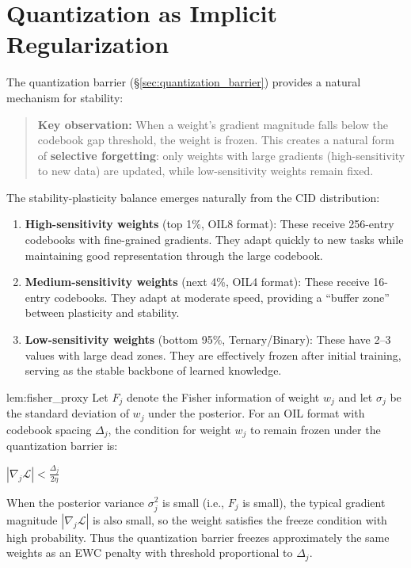 \section{Quantization as Implicit Regularization}
\label{sec:quant_as_regularization}

The quantization barrier (\S\ref{sec:quantization_barrier}) provides a natural mechanism for stability:

\begin{quote}
\textbf{Key observation:} When a weight's gradient magnitude falls below the codebook gap threshold, the weight is frozen. This creates a natural form of \textbf{selective forgetting}: only weights with large gradients (high-sensitivity to new data) are updated, while low-sensitivity weights remain fixed.
\end{quote}

The stability-plasticity balance emerges naturally from the CID distribution:

\begin{enumerate}
    \item \textbf{High-sensitivity weights} (top 1\%, OIL8 format): These receive 256-entry codebooks with fine-grained gradients. They adapt quickly to new tasks while maintaining good representation through the large codebook.
    \item \textbf{Medium-sensitivity weights} (next 4\%, OIL4 format): These receive 16-entry codebooks. They adapt at moderate speed, providing a ``buffer zone'' between plasticity and stability.
    \item \textbf{Low-sensitivity weights} (bottom 95\%, Ternary/Binary): These have 2--3 values with large dead zones. They are effectively frozen after initial training, serving as the stable backbone of learned knowledge.
\end{enumerate}

\begin{mylemma}{lem:fisher_proxy}
Let $F_j$ denote the Fisher information of weight $w_j$ and let $\sigma_j$ be the standard deviation of $w_j$ under the posterior. For an OIL format with codebook spacing $\Delta_j$, the condition for weight $w_j$ to remain frozen under the quantization barrier is:

$|\nabla_j \mathcal{L}| < \frac{\Delta_j}{2\eta}$

When the posterior variance $\sigma_j^2$ is small (i.e., $F_j$ is small), the typical gradient magnitude $|\nabla_j \mathcal{L}|$ is also small, so the weight satisfies the freeze condition with high probability. Thus the quantization barrier freezes approximately the same weights as an EWC penalty with threshold proportional to $\Delta_j$.
\end{mylemma}

